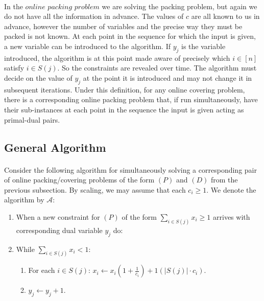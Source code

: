 \documentclass[letterpaper,12pt,oneside,onecolumn]{article}
\newcommand{\cA}{\mathcal{A}} \newcommand{\cB}{\mathcal{B}}
\begin{document}
\paragraph{}
In the $\textit{online packing problem}$ we are solving the packing problem, but again we do not have all the information in advance. The values of $c$ are all known to us in advance, however the number of variables and the precise way they must be packed is not known. At each point in the sequence for which the input is given, a new variable can be introduced to the algorithm. If $y_j$ is the variable introduced, the algorithm is at this point made aware of precisely which $i \in [n]$ satisfy $i \in S(j)$. So the constraints are revealed over time. The algorithm must decide on the value of $y_j$ at the point it is introduced and may not change it in subsequent iterations. Under this definition, for any online covering problem, there is a corresponding online packing problem that, if run simultaneously, have their sub-instances at each point in the sequence the input is given acting as primal-dual pairs.
\subsection{General Algorithm}
\paragraph{}
Consider the following algorithm for simultaneously solving a corresponding pair of online packing/covering problems of the form $(P)$ and $(D)$ from the previous subsection. By scaling, we may assume that each $c_i \geq 1$. We denote the algorithm by $\cA$:
\begin{enumerate}
\item When a new constraint for $(P)$ of the form $\sum_{i \in S(j)} x_i \geq 1$ arrives with corresponding dual variable $y_j$ do:
\item While $\sum_{i \in S(j)} x_i < 1$:
	\begin{enumerate}
	\item For each $i \in S(j)$: $x_i \leftarrow x_i(1+\frac{1}{c_i}) + 1(|S(j)|\cdot c_i)$.
	\item $y_j \leftarrow y_j +1$.
	\end{enumerate}
\end{enumerate}
\end{document}
